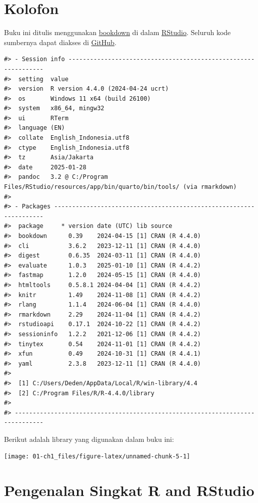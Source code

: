 \documentclass[
  oneside]{book}
\begin{document}
\section{Kolofon}\label{kolofon}

Buku ini ditulis menggunakan \href{http://bookdown.org/}{bookdown} di dalam
\href{http://www.rstudio.com/ide/}{RStudio}. Seluruh kode sumbernya dapat
diakses di \href{https://github.com/dedenistiawan/ClustR}{GitHub}.

\begin{verbatim}
#> - Session info ---------------------------------------------------------------
#>  setting  value
#>  version  R version 4.4.0 (2024-04-24 ucrt)
#>  os       Windows 11 x64 (build 26100)
#>  system   x86_64, mingw32
#>  ui       RTerm
#>  language (EN)
#>  collate  English_Indonesia.utf8
#>  ctype    English_Indonesia.utf8
#>  tz       Asia/Jakarta
#>  date     2025-01-28
#>  pandoc   3.2 @ C:/Program Files/RStudio/resources/app/bin/quarto/bin/tools/ (via rmarkdown)
#> 
#> - Packages -------------------------------------------------------------------
#>  package     * version date (UTC) lib source
#>  bookdown      0.39    2024-04-15 [1] CRAN (R 4.4.0)
#>  cli           3.6.2   2023-12-11 [1] CRAN (R 4.4.0)
#>  digest        0.6.35  2024-03-11 [1] CRAN (R 4.4.0)
#>  evaluate      1.0.3   2025-01-10 [1] CRAN (R 4.4.2)
#>  fastmap       1.2.0   2024-05-15 [1] CRAN (R 4.4.0)
#>  htmltools     0.5.8.1 2024-04-04 [1] CRAN (R 4.4.2)
#>  knitr         1.49    2024-11-08 [1] CRAN (R 4.4.2)
#>  rlang         1.1.4   2024-06-04 [1] CRAN (R 4.4.0)
#>  rmarkdown     2.29    2024-11-04 [1] CRAN (R 4.4.2)
#>  rstudioapi    0.17.1  2024-10-22 [1] CRAN (R 4.4.2)
#>  sessioninfo   1.2.2   2021-12-06 [1] CRAN (R 4.4.2)
#>  tinytex       0.54    2024-11-01 [1] CRAN (R 4.4.2)
#>  xfun          0.49    2024-10-31 [1] CRAN (R 4.4.1)
#>  yaml          2.3.8   2023-12-11 [1] CRAN (R 4.4.0)
#> 
#>  [1] C:/Users/Deden/AppData/Local/R/win-library/4.4
#>  [2] C:/Program Files/R/R-4.4.0/library
#> 
#> ------------------------------------------------------------------------------
\end{verbatim}

Berikut adalah library yang digunakan dalam buku ini:

\begin{center}\texttt{[image: 01-ch1\_files/figure-latex/unnamed-chunk-5-1]} \end{center}

\section{Pengenalan Singkat R and RStudio}\label{pengenalan-singkat-r-and-rstudio}
\end{document}
